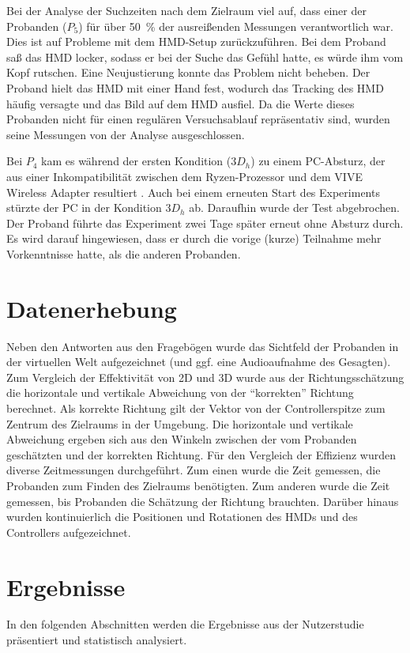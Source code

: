 Bei der Analyse der Suchzeiten nach dem Zielraum viel auf, dass einer der Probanden ($P_5$) für über \SI{50}{\percent} der ausreißenden Messungen verantwortlich war.
Dies ist auf Probleme mit dem HMD-Setup zurückzuführen.
Bei dem Proband saß das HMD locker, sodass er bei der Suche das Gefühl hatte, es würde ihm vom Kopf rutschen.
Eine Neujustierung konnte das Problem nicht beheben.
Der Proband hielt das HMD mit einer Hand fest, wodurch das Tracking des HMD häufig versagte und das Bild auf dem HMD ausfiel.
Da die Werte dieses Probanden nicht für einen regulären Versuchsablauf repräsentativ sind, wurden seine Messungen von der Analyse ausgeschlossen.

Bei $P_4$ kam es während der ersten Kondition ($3D_h$) zu einem PC-Absturz, der aus einer Inkompatibilität zwischen dem Ryzen-Prozessor und dem VIVE Wireless Adapter resultiert \parencite{HTCCorporation2018c}.
Auch bei einem erneuten Start des Experiments stürzte der PC in der Kondition $3D_h$ ab.
Daraufhin wurde der Test abgebrochen.
Der Proband führte das Experiment zwei Tage später erneut ohne Absturz durch.
Es wird darauf hingewiesen, dass er durch die vorige (kurze) Teilnahme mehr Vorkenntnisse hatte, als die anderen Probanden.

\section{Datenerhebung}
Neben den Antworten aus den Fragebögen wurde das Sichtfeld der Probanden in der virtuellen Welt aufgezeichnet (und ggf. eine Audioaufnahme des Gesagten).
Zum Vergleich der Effektivität von 2D und 3D wurde aus der Richtungsschätzung die horizontale und vertikale Abweichung von der \enquote{korrekten} Richtung berechnet.
Als korrekte Richtung gilt der Vektor von der Controllerspitze zum Zentrum des Zielraums in der Umgebung.
Die horizontale und vertikale Abweichung ergeben sich aus den Winkeln zwischen der vom Probanden geschätzten und der korrekten Richtung.
Für den Vergleich der Effizienz wurden diverse Zeitmessungen durchgeführt.
Zum einen wurde die Zeit gemessen, die Probanden zum Finden des Zielraums benötigten.
Zum anderen wurde die Zeit gemessen, bis Probanden die Schätzung der Richtung brauchten.
Darüber hinaus wurden kontinuierlich die Positionen und Rotationen des HMDs und des Controllers aufgezeichnet.

\section{Ergebnisse}
In den folgenden Abschnitten werden die Ergebnisse aus der Nutzerstudie präsentiert und statistisch analysiert.

